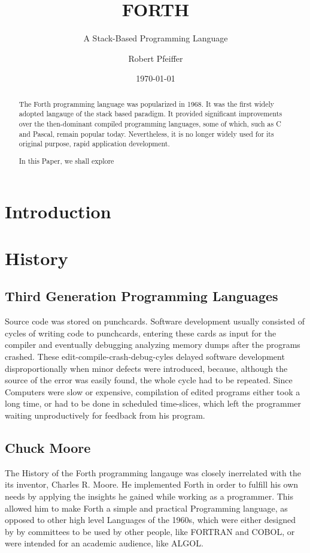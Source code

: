 \documentclass{llncs}
\title{FORTH}
\subtitle{A Stack-Based Programming Language}
\author{Robert Pfeiffer}
\date{\today}
\institute{History of Programming Languages, Software Architecture Group, Hasso-Plattner-Institut, Universität Potsdam, D-14482 Potsdam, Germany,\\
  \email{robert.pfeiffer@student.hpi.uni-potsdam.de}}
\begin{document}
\maketitle
\begin{abstract}
  The Forth programming language was popularized in 1968. It was the first widely adopted langauge of the stack based paradigm. It provided significant improvements over the then-dominant compiled programming languages, some of which, such as C and Pascal, remain popular today. Nevertheless, it is no longer widely used for its original purpose, rapid application development.

  In this Paper, we shall explore 
\end{abstract}
\section{Introduction}
\section{History}

\subsection{Third Generation Programming Languages}
Source code was stored on punchcards. Software development usually consisted of cycles of writing code to punchcards, entering these cards as input for the compiler and eventually debugging analyzing memory dumps after the programs crashed. These edit-compile-crash-debug-cyles delayed software development disproportionally when minor defects were introduced, because, although the source of the error was easily found, the whole cycle had to be repeated. Since Computers were slow or expensive, compilation of edited programs either took a long time, or had to be done in scheduled time-slices, which left the programmer waiting unproductively for feedback from his program.

\subsection{Chuck Moore}
The History of the Forth programming langauge was closely inerrelated with the its inventor, Charles R. Moore. He implemented Forth in order to fulfill his own needs by applying the insights he gained while working as a programmer. This allowed him to make Forth a simple and practical Programming language, as opposed to other high level Languages of the 1960s, which were either designed by by committees to be used by other people, like FORTRAN and COBOL, or were intended for an academic audience, like ALGOL. 
\end{document}
